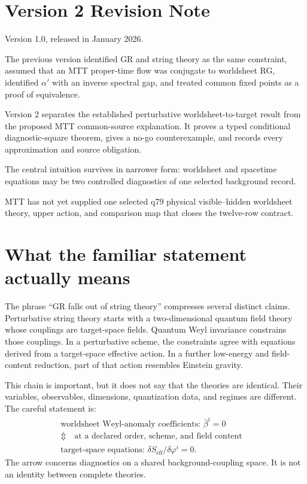 \documentclass[11pt]{article}
\begin{document}
\section*{Version 2 Revision Note}
\begin{description}[leftmargin=2.8cm,style=nextline]
\item[Supersedes] Version 1.0, released in January 2026.
\item[Reason] The previous version identified GR and string theory as the
same constraint, assumed that an MTT proper-time flow was conjugate to
worldsheet RG, identified \(\alpha'\) with an inverse spectral gap, and
treated common fixed points as a proof of equivalence.
\item[Resolution] Version 2 separates the established perturbative
worldsheet-to-target result from the proposed MTT common-source explanation.
It proves a typed conditional diagnostic-square theorem, gives a no-go
counterexample, and records every approximation and source obligation.
\item[Retained content] The central intuition survives in narrower form:
worldsheet and spacetime equations may be two controlled diagnostics of one
selected background record.
\item[Open boundary] MTT has not yet supplied one selected q79 physical
visible--hidden worldsheet theory, upper action, and comparison map that
closes the twelve-row contract.
\end{description}

\tableofcontents

\section{What the familiar statement actually means}

The phrase ``GR falls out of string theory'' compresses several distinct
claims.  Perturbative string theory starts with a two-dimensional quantum
field theory whose couplings are target-space fields.  Quantum Weyl
invariance constrains those couplings.  In a perturbative scheme, the
constraints agree with equations derived from a target-space effective
action.  In a further low-energy and field-content reduction, part of that
action resembles Einstein gravity.

This chain is important, but it does not say that the theories are identical.
Their variables, observables, dimensions, quantization data, and regimes are
different.  The careful statement is:
\[
\begin{array}{c}
\text{worldsheet Weyl-anomaly coefficients: }\bar\beta^i=0\\[0.35em]
\Updownarrow\quad\text{at a declared order, scheme, and field content}\quad\\[0.35em]
\text{target-space equations: }\delta S_{\mathrm{eff}}/\delta\varphi^i=0 .
\end{array}
\]
The arrow concerns diagnostics on a shared background-coupling space.  It is
not an identity between complete theories.
\end{document}
